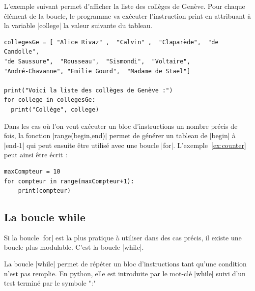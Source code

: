 \documentclass[11pt, a4paper]{book}
\begin{document}
\begin{example}
L'exemple suivant permet d'afficher la liste des collèges de Genève. Pour chaque élément de la boucle, le programme va exécuter l'instruction print en attribuant à la variable |college| la valeur suivante du tableau.
\end{example}

\begin{lstlisting}
collegesGe = [ "Alice Rivaz" ,  "Calvin" ,  "Claparède",  "de Candolle", 
"de Saussure",  "Rousseau",  "Sismondi",  "Voltaire", 
"André-Chavanne", "Emilie Gourd",  "Madame de Stael"]

print("Voici la liste des collèges de Genève :")
for college in collegesGe:
  print("Collège", college)
\end{lstlisting}

\begin{remarque}
Dans les cas où l'on veut exécuter un bloc d'instructions un nombre précis de fois, la fonction |range(begin,end)| permet de générer un tableau de |begin| à |end-1| qui peut ensuite être utilisé avec une boucle |for|. L'exemple~\ref{ex:counter} peut ainsi être écrit : 

\end{remarque}

\begin{lstlisting}
maxCompteur = 10
for compteur in range(maxCompteur+1):
    print(compteur)
\end{lstlisting}


\subsection{La boucle \textsf{while}}
Si la boucle |for| est la plus pratique à utiliser dans des cas précis, il existe une boucle plus modulable. C'est la boucle |while|.

\begin{defi} La boucle |while| permet de répéter un bloc d'instructions tant qu'une condition n'est pas remplie. En python, elle est introduite par le mot-clé |while| suivi d'un test terminé par le symbole ":" 
\end{defi}
\end{document}
